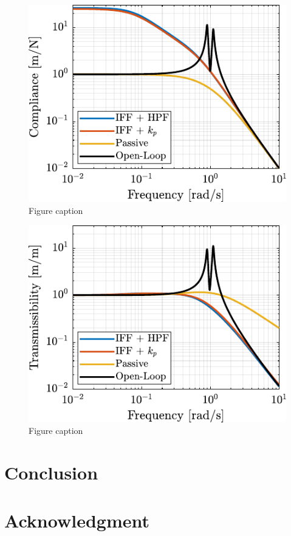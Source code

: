 \documentclass{ISMA_USD2020}
\begin{document}
\begin{figure}[htbp]
\centering
\includegraphics[scale=1]{figs/comp_compliance.pdf}
\caption{\label{fig:comp_compliance}Figure caption}
\end{figure}

\begin{figure}[htbp]
\centering
\includegraphics[scale=1]{figs/comp_transmissibility.pdf}
\caption{\label{fig:comp_transmissibility}Figure caption}
\end{figure}

\section{Conclusion}
\label{sec:orgcdf948f}
\label{sec:conclusion}


\section*{Acknowledgment}
\label{sec:org6c21e13}


\end{document}
